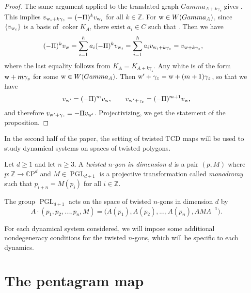 \documentclass[10pt,a4paper]{amsart}
\numberwithin{equation}{section}
\newcommand{\Z}{{\mathbb Z}}
\newcommand{\C}{{\mathbb C}}
\newcommand{\CP}{{\mathbb C\mathrm P}}
\newcommand{\A}{{\mathbb A}}
\newcommand{\PGL}{\operatorname{PGL}}
\newcommand{\ra}{\rightarrow}
\newcommand{\w}{{\rm w}}
\DeclareMathOperator{\coker}{coker}
\def\A{A}
\def\Gamma{Gamma}
\def\widehat#1{#1}
\def\C{C}
\begin{document}
\begin{proof}
		The same argument applied to the translated graph $\Gamma_{\A+k \gamma_z}$ gives . This implies $v_{{\rm w}_i+k\gamma_z}=(-\Pi{})^k v_{{\rm w}_i}$ for all $k \in \Z$.
		For ${\rm w} \in W(\Gamma_{ \A})$, since $\{v_{\w_i}\}$ is a basis {of $\coker K_\A$}, there exist $a_i\in\C$ such that . Then we have
  \begin{align*}(-\Pi{})^k v_{{\rm w}}&=\sum_{i=1}^h a_i (-\Pi{})^k v_{{\rm w}_i} = \sum_{i=1}^h a_i v_{{\rm w}_i+k\gamma_z} =v_{{\rm w}+k\gamma_z},
		\end{align*}
		where the last equality follows from $K_{\A}{}=K_{{\A+ k \gamma_z}}{}$. Any white \smash{${\rm w}'\in W\bigl(\Gamma_{\widehat \A}\bigr)$} is of the form~${\rm w}+m\gamma_z$ for some ${\rm w} \in W(\Gamma_{\A})$. Then ${\rm w}'+\gamma_z={\rm w}+(m+1) \gamma_z$, so that we have
		\[
		v_{{\rm w}'}=(-\Pi{})^m v_{{\rm w}}, \qquad v_{{\rm w}'+\gamma_z}=(-\Pi{})^{m+1}v_{\rm w},
		\]
		and therefore $v_{{\rm w}'+\gamma_z}=-\Pi{}v_{{\rm w}'}$. Projectivizing, we get the statement of the proposition.
	\end{proof}

	
	In the second half of the paper, the setting of twisted TCD maps will be used to study dynamical systems on spaces of twisted polygons.
	
	\begin{Definition}
		Let $d\geq1$ and let $n \geq 3$. A \emph{twisted $n$-gon in dimension $d$} is a pair $(p,M)$ where $p\colon \Z \ra \CP^d$ and $M \in \PGL_{d+1}$ is a projective transformation called \emph{monodromy} such that $p_{i+n}=M(p_i)$ for all $i \in \Z$.
		
		The group $\PGL_{d+1}$ acts on the space of twisted $n$-gons in dimension $d$ by
		\begin{equation}
			\label{eq:pglaction}
			A \cdot (p_1,p_2,\dots,p_n,M) = \big(A(p_1),A(p_2),\dots,A(p_n),AMA^{-1}\big).
		\end{equation}
	\end{Definition}
	
	For each dynamical system considered, we will impose some additional nondegeneracy conditions for the twisted $n$-gons, which will be specific to each dynamics.
	
\section{The pentagram map}\label{sec:pentagram}
	
\end{document}
